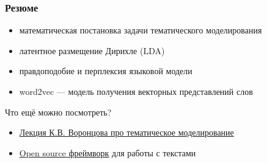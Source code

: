 \documentclass[fullscreen=true, bookmarks=true, hyperref={pdfencoding=unicode}]{beamer}
\begin{document}
\begin{frame}
  \frametitle{Резюме}

  \begin{itemize}
    \item математическая постановка задачи тематического моделирования
    \item латентное размещение Дирихле (LDA)
    \item правдоподобие и перплексия языковой модели
    \item word2vec — модель получения векторных представлений слов
  \end{itemize}
  \pause
  Что ещё можно посмотреть?
  \begin{itemize}
    \item \href{https://youtu.be/Eqm8-YqUzAc}{Лекция К.В. Воронцова про тематическое моделирование}
    \item \href{https://deeppavlov.ai/}{Open source фреймворк} для работы с текстами
  \end{itemize}
\end{frame}
\end{document}
